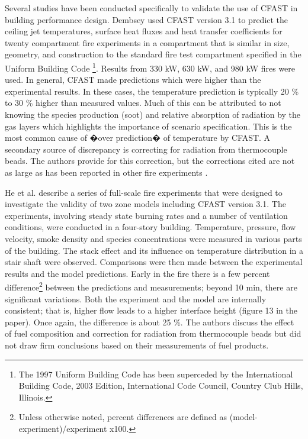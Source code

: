 Several studies have been conducted specifically to validate the use of CFAST in building performance design. Dembsey   \cite{Valid:Dempsey} used CFAST version 3.1 to predict the ceiling jet temperatures, surface heat fluxes and heat transfer coefficients for twenty compartment fire experiments in a compartment that is similar in size, geometry, and construction to the standard fire test compartment specified in the Uniform Building Code \cite{UBC}\footnote{The 1997 Uniform Building Code has been superceded by the International Building Code, 2003 Edition, International Code Council, Country Club Hills, Illinois.}. Results from 330 kW, 630 kW, and 980 kW fires were used. In general, CFAST made predictions which were higher than the experimental results. In these cases, the temperature prediction is typically 20 \% to 30 \% higher than measured values. Much of this can be attributed to not knowing the species production (soot) and relative absorption of radiation by the gas layers which highlights the importance of scenario specification. This is the most common cause of  �over prediction� of temperature by CFAST. A secondary source of discrepancy is correcting for radiation from thermocouple beads. The authors provide for this correction, but the corrections cited are not as large as has been reported in other fire experiments \cite{Valid:Pitts}.

He et al. \cite{Valid:He} describe a series of full-scale fire experiments that were designed to investigate the validity of two zone models including CFAST version 3.1. The experiments, involving steady state burning rates and a number of ventilation conditions, were conducted in a four-story building. Temperature, pressure, flow velocity, smoke density and species concentrations were measured in various parts of the building. The stack effect and its influence on temperature distribution in a stair shaft were observed. Comparisons were then made between the experimental results and the model predictions. Early in the fire there is a few percent difference\footnote{Unless otherwise noted, percent differences are defined as (model-experiment)/experiment x100.} between the predictions and measurements; beyond 10 min, there are significant variations. Both the experiment and the model are internally consistent; that is, higher flow leads to a higher interface height (figure 13 in the paper). Once again, the difference is about 25 \%. The authors discuss the effect of fuel composition and correction for radiation from thermocouple beads but did not draw firm conclusions based on their measurements of fuel products.

